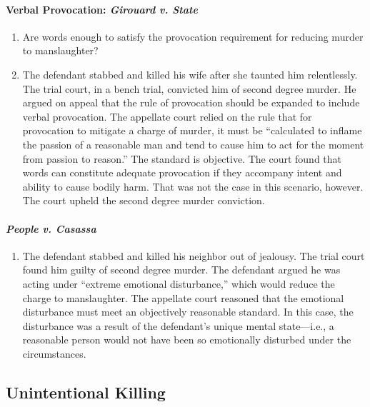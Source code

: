 \paragraph{Verbal Provocation: \emph{Girouard v. State}}

\begin{enumerate}
    \item Are words enough to satisfy the provocation requirement for reducing murder to manslaughter?
    \item The defendant stabbed and killed his wife after she taunted him relentlessly. The trial court, in a bench trial, convicted him of second degree murder. He argued on appeal that the rule of provocation should be expanded to include verbal provocation. The appellate court relied on the rule that for provocation to mitigate a charge of murder, it must be ``calculated to inflame the passion of a reasonable man and tend to cause him to act for the moment from passion to reason.'' The standard is objective. The court found that words can constitute adequate provocation if they accompany intent and ability to cause bodily harm. That was not the case in this scenario, however. The court upheld the second degree murder conviction.
\end{enumerate}

\paragraph{\emph{People v. Casassa}}

\begin{enumerate}
    \item The defendant stabbed and killed his neighbor out of jealousy. The trial court found him guilty of second degree murder. The defendant argued he was acting under ``extreme emotional disturbance,'' which would reduce the charge to manslaughter. The appellate court reasoned that the emotional disturbance must meet an objectively reasonable standard. In this case, the disturbance was a result of the defendant's unique mental state---i.e., a reasonable person would not have been so emotionally disturbed under the circumstances.
\end{enumerate}

\subsection{Unintentional Killing}

